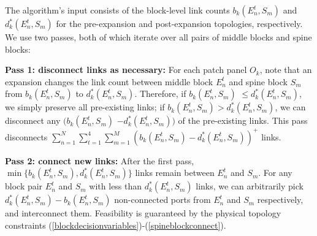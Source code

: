 \documentclass[letterpaper,twocolumn,10pt]{article}
\begin{document}
The algorithm's input consists of the block-level link counts $b_k(E_n^t,S_m)$ and $d^*_k(E_n^t,S_m)$ for the pre-expansion and post-expansion topologies, respectively.  We use two passes, both of which iterate over all pairs of middle blocks and spine blocks:

\textbf{Pass 1: disconnect links as necessary:}
For each patch panel $O_k$, note that an expansion changes the link count between middle block $E_n^t$ and spine block $S_m$ from  $b_k(E_n^t,S_m)$ to $d^*_k(E_n^t,S_m)$.  Therefore, if $b_k(E_n^t,S_m)$ $\leq d^*_k(E_n^t,S_m)$, we simply preserve all pre-existing links; if $b_k(E_n^t,S_m)>d^*_k(E_n^t,S_m)$, we can disconnect any $(b_k(E_n^t,S_m)$ $-d^*_k(E_n^t,S_m))$ of the pre-existing links. This pass disconnects $\sum_{n=1}^N\sum_{t=1}^4\sum_{m=1}^M(b_k(E_n^t,S_m)-d^*_k(E_n^t,S_m))^+$ links.

\textbf{Pass 2: connect new links:}
After the first pass, $\min\{b_k(E_n^t,S_m), d^*_k(E_n^t,S_m)\}$ links remain between
$E_n^t$ and $S_m$.  For any block pair $E_n^t$ and $S_m$ with less than $d^*_k(E_n^t,S_m)$ links, we can arbitrarily pick $d^*_k(E_n^t,S_m)-b_k(E_n^t,S_m)$ non-connected ports from $E_n^t$ and $S_m$ respectively, and interconnect them. Feasibility is guaranteed by the physical topology constraints (\ref{blockdecisionvariables})-(\ref{spineblockconnect}).

\end{document}
